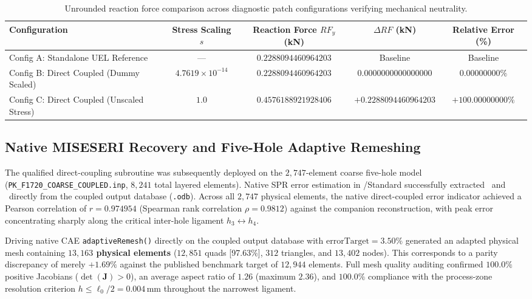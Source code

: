 \begin{table}[htbp]
\centering
\small
\caption{Unrounded reaction force comparison across diagnostic patch configurations verifying mechanical neutrality.}
\label{tab:f1720_diagnostic_neutrality}
\begin{tabular}{lcccc}
\hline\hline
\textbf{Configuration} & \textbf{Stress Scaling $s$} & \textbf{Reaction Force $RF_y$ (kN)} & \textbf{$\Delta RF$ (kN)} & \textbf{Relative Error (\%)} \\
\hline
Config A: Standalone UEL Reference & --- & $0.2288094460964203$ & Baseline & Baseline \\
Config B: Direct Coupled (Dummy Scaled) & $4.7619 \times 10^{-14}$ & $0.2288094460964203$ & $0.0000000000000000$ & $\mathbf{0.00000000\%}$ \\
Config C: Direct Coupled (Unscaled Stress) & $1.0$ & $0.4576188921928406$ & $+0.2288094460964203$ & $\mathbf{+100.00000000\%}$ \\
\hline\hline
\end{tabular}
\end{table}

\subsection{Native MISESERI Recovery and Five-Hole Adaptive Remeshing}
\label{subsec:f1720_remesh_reproduction}

The qualified direct-coupling subroutine was subsequently deployed on the $2{,}747$-element coarse five-hole model (\texttt{PK\_F1720\_COARSE\_COUPLED.inp}, $8{,}241$ total layered elements). Native SPR error estimation in \Abaqus/Standard successfully extracted \MISESERI\ and \MISESAVG\ directly from the coupled output database (\texttt{.odb}). Across all $2{,}747$ physical elements, the native direct-coupled error indicator achieved a Pearson correlation of $r = 0.974954$ (Spearman rank correlation $\rho = 0.9812$) against the companion reconstruction, with peak error concentrating sharply along the critical inter-hole ligament $h_3 \leftrightarrow h_4$.

Driving native \Abaqus CAE \texttt{adaptiveRemesh()} directly on the coupled output database with $\mathrm{errorTarget} = 3.50\%$ generated an adapted physical mesh containing \textbf{$13{,}163$ physical elements} ($12{,}851$ quads [97.63\%], $312$ triangles, and $13{,}402$ nodes). This corresponds to a parity discrepancy of merely \textbf{$+1.69\%$} against the published benchmark target of $12{,}944$ elements. Full mesh quality auditing confirmed $100.0\%$ positive Jacobians ($\det(\mathbf{J}) > 0$), an average aspect ratio of $1.26$ (maximum $2.36$), and $100.0\%$ compliance with the process-zone resolution criterion $h \le \ell_0 / 2 = 0.004\,\mathrm{mm}$ throughout the narrowest ligament.

